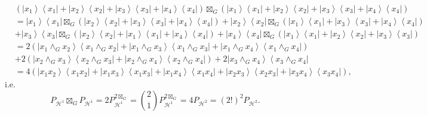\documentclass[aps,preprint]{revtex4}%
\begin{document}
\begin{align}
&  \left(  \left\vert x_{1}\right\rangle \left\langle x_{1}\right\vert
+\left\vert x_{2}\right\rangle \left\langle x_{2}\right\vert +\left\vert
x_{3}\right\rangle \left\langle x_{3}\right\vert +\left\vert x_{4}%
\right\rangle \left\langle x_{4}\right\vert \right)  \boxtimes_{G}\left(
\left\vert x_{1}\right\rangle \left\langle x_{1}\right\vert +\left\vert
x_{2}\right\rangle \left\langle x_{2}\right\vert +\left\vert x_{3}%
\right\rangle \left\langle x_{3}\right\vert +\left\vert x_{4}\right\rangle
\left\langle x_{4}\right\vert \right) \\
&  =\left\vert x_{1}\right\rangle \left\langle x_{1}\right\vert \boxtimes
_{G}\left(  \left\vert x_{2}\right\rangle \left\langle x_{2}\right\vert
+\left\vert x_{3}\right\rangle \left\langle x_{3}\right\vert +\left\vert
x_{4}\right\rangle \left\langle x_{4}\right\vert \right)  +\left\vert
x_{2}\right\rangle \left\langle x_{2}\right\vert \boxtimes_{G}\left(
\left\vert x_{1}\right\rangle \left\langle x_{1}\right\vert +\left\vert
x_{3}\right\rangle \left\langle x_{3}\right\vert +\left\vert x_{4}%
\right\rangle \left\langle x_{4}\right\vert \right) \\
&  +\left\vert x_{3}\right\rangle \left\langle x_{3}\right\vert \boxtimes
_{G}\left(  \left\vert x_{2}\right\rangle \left\langle x_{2}\right\vert
+\left\vert x_{1}\right\rangle \left\langle x_{1}\right\vert +\left\vert
x_{4}\right\rangle \left\langle x_{4}\right\vert \right)  +\left\vert
x_{4}\right\rangle \left\langle x_{4}\right\vert \boxtimes_{G}\left(
\left\vert x_{1}\right\rangle \left\langle x_{1}\right\vert +\left\vert
x_{2}\right\rangle \left\langle x_{2}\right\vert +\left\vert x_{3}%
\right\rangle \left\langle x_{3}\right\vert \right) \\
&  =2\left(  \left\vert x_{1}\wedge_{G}x_{2}\right\rangle \left\langle
x_{1}\wedge_{G}x_{2}\right\vert +\left\vert x_{1}\wedge_{G}x_{3}\right\rangle
\left\langle x_{1}\wedge_{G}x_{3}\right\vert +\left\vert x_{1}\wedge_{G}%
x_{4}\right\rangle \left\langle x_{1}\wedge_{G}x_{4}\right\vert \right) \\
&  +2\left(  \left\vert x_{2}\wedge_{G}x_{3}\right\rangle \left\langle
x_{2}\wedge_{G}x_{3}\right\vert +\left\vert x_{2}\wedge_{G}x_{4}\right\rangle
\left\langle x_{2}\wedge_{G}x_{4}\right\vert \right)  +2\left\vert x_{3}%
\wedge_{G}x_{4}\right\rangle \left\langle x_{3}\wedge_{G}x_{4}\right\vert \\
&  =4\left(  \left\vert x_{1}x_{2}\right\rangle \left\langle x_{1}%
x_{2}\right\vert +\left\vert x_{1}x_{3}\right\rangle \left\langle x_{1}%
x_{3}\right\vert +\left\vert x_{1}x_{4}\right\rangle \left\langle x_{1}%
x_{4}\right\vert +\left\vert x_{2}x_{3}\right\rangle \left\langle x_{2}%
x_{3}\right\vert +\left\vert x_{3}x_{4}\right\rangle \left\langle x_{3}%
x_{4}\right\vert \right)  ,
\end{align}
i.e.
\begin{equation}
P_{\mathcal{H}^{1}}\boxtimes_{G}P_{\mathcal{H}^{1}}=2P_{\mathcal{H}^{1}%
}^{2\boxtimes_{G}}=\binom{2}{1}P_{\mathcal{H}^{1}}^{2\boxtimes_{G}%
}=4P_{\mathcal{H}^{2}}=\left(  2!\right)  ^{2}P_{\mathcal{H}^{2}}.
\end{equation}
\end{document}
